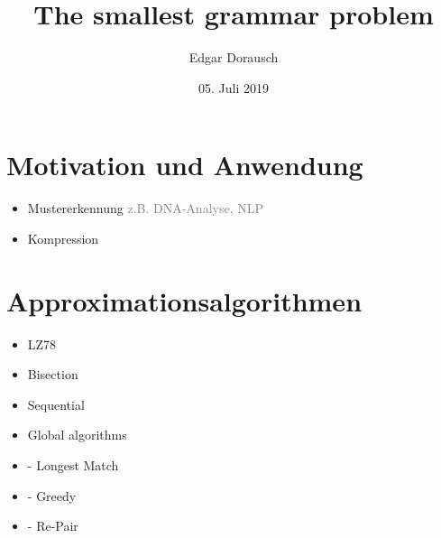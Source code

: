 \documentclass[xcolor=dvipsnames]{beamer}
\title{The smallest grammar problem}
\date{05. Juli 2019}
\author{Edgar Dorausch}
\begin{document}
\maketitle


\newcommand{\SubItem}[1]{
  \setlength\itemindent{15pt} \item[-] #1
}
\newcommand{\Gap}{$ $ \linebreak}
\newcommand{\FrameName}{
	\ifthenelse{\equal{\subsecname}{}}{
		\secname
	}{
		\secname \thinspace -\thinspace\subsecname
	}
}

\newcommand{\Fresh}{\ddagger}
\newcommand{\Hint}[1]{\textcolor{gray}{#1}}

\newcommand{\PDFC}[1]{
	\ifthenelse{\boolean{WithComments}}{
		\pdfcomment[color=red,icon=Note]{#1}
	}{
	}
}

\section{Motivation und Anwendung}

\begin{frame}{\FrameName}
	\begin{itemize}[<+->]
		\item Mustererkennung \linebreak
		\Hint{z.B. DNA-Analyse, NLP}
		\item Kompression
	\end{itemize}
\end{frame}





\section{Approximationsalgorithmen}

\begin{frame}{\FrameName}
	\begin{itemize}[<+->]
		\item LZ78
		\item Bisection 
		\item Sequential
		\item Global algorithms
		\SubItem{Longest Match}
		\SubItem{Greedy}
		\SubItem{Re-Pair}
	\end{itemize}
\end{frame}
\end{document}
